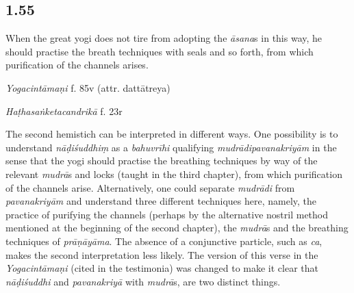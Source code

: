 \begin{ekdosis}

\subsection*{1.55}
\begin{translation}[hp01_055]
When the great yogi does not tire from adopting the \emph{āsana}s in this way, he should  practise the breath techniques with seals and so forth, from which purification of the channels arises.%
\end{translation}


\begin{testimonia}[hp01_055]
\emph{Yogacintāmaṇi} f. 85v (attr. dattātreya)

\begin{versinnote}
\end{versinnote}

\emph{Haṭhasaṅketacandrikā} f. 23r

\begin{versinnote}
\tl{\var{nāḍiśuddhiṃ ] \emph{em.}, nāhiśuddhi ms. no. 2244}\\!}
\end{versinnote}

\end{testimonia}

\begin{philcomm}[hp01_055]
The second hemistich can be interpreted in different ways. One possibility is to understand \emph{nāḍiśuddhiṃ} as a \emph{bahuvrīhi} qualifying \emph{mudrādipavanakriyām} in the sense that the yogi should practise the breathing techniques by way of the relevant \emph{mudrā}s and locks (taught in the third chapter), from which purification of the channels arise. Alternatively, one could separate \emph{mudrādi} from \emph{pavanakriyām} and understand three different techniques here, namely, the practice of purifying the channels (perhaps by the alternative nostril method mentioned at the beginning of the second chapter), the \emph{mudrā}s and the breathing techniques of \emph{prāṇāyāma}. The absence of a conjunctive particle, such as \emph{ca}, makes the second interpretation less likely. The version of this verse in the \emph{Yogacintāmaṇi} (cited in the testimonia) was changed to make it clear that \emph{nāḍiśuddhi} and \emph{pavanakriyā} with \emph{mudrā}s, are two distinct things. 


\end{philcomm}
\end{ekdosis}
